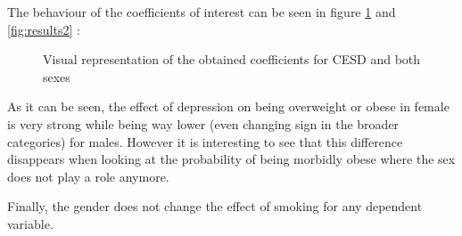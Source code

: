 The behaviour of the coefficients of interest can be seen in figure \ref{fig:results} and  \ref{fig:results2} :

\begin{figure}[H]
\caption{Visual representation of the obtained coefficients for CESD and both sexes}
\label{fig:results}
\end{figure}

As it can be seen, the effect of depression on being overweight or obese in female is very strong while being way lower (even changing sign in the broader categories) for males. However it is interesting to see that this difference disappears when looking at the probability of being morbidly obese where the sex does not play a role anymore.

Finally, the gender does not change the effect of smoking for any dependent variable.